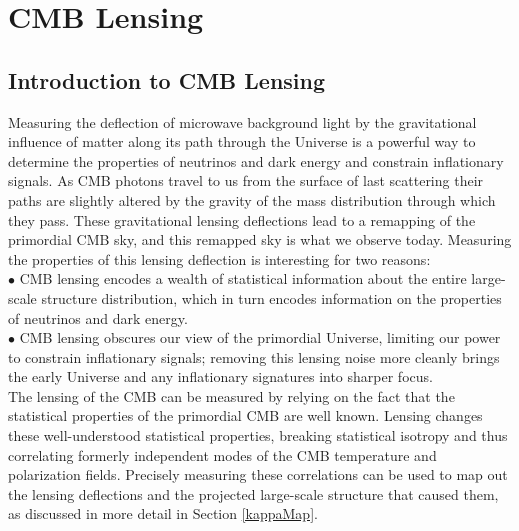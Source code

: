  
\chapter{CMB Lensing}
\renewcommand*\thesection{\arabic{section}}


\def\nnu{N_{\mathrm eff}}
\def\gtrsim{\raise-.75ex\hbox{$\buildrel>\over\sim$}}

\section{Introduction to CMB Lensing}

Measuring the deflection of microwave background light by the gravitational influence of matter along its path through the Universe is a powerful way to determine the properties of neutrinos and dark energy and constrain inflationary signals.  As CMB photons travel to us from the surface of last scattering their paths are slightly altered by the gravity of the mass distribution through which they pass.  These gravitational lensing deflections lead to a remapping of the primordial CMB sky, and this remapped sky is what we observe today.  Measuring the properties of this lensing deflection is interesting for two reasons:\\


$\bullet$ CMB lensing encodes a wealth of statistical information about the entire large-scale structure distribution, which in turn encodes information on the properties of neutrinos and dark energy.\\


$\bullet$ CMB lensing obscures our view of the primordial Universe, limiting our power to constrain inflationary signals; removing this lensing noise more cleanly brings the early Universe and any inflationary signatures into sharper focus.\\

The lensing of the CMB can be measured by relying on the fact that the statistical properties of the primordial CMB are well known.  Lensing changes these well-understood statistical properties, breaking statistical isotropy and thus correlating formerly independent modes of the CMB temperature and polarization fields.  Precisely measuring these correlations can be used to map out the lensing deflections and the projected large-scale structure that caused them, as discussed in more detail in Section \ref{kappaMap}.

